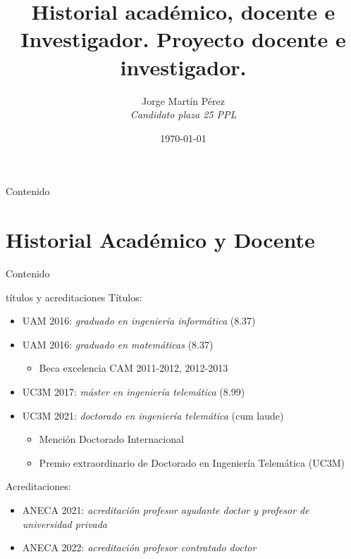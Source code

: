 \documentclass[xcolor=table,xcolor=x11names]{beamer}
\title{Historial académico, docente e Investigador.
Proyecto docente e investigador.}
\date{\today}
\author{Jorge Martín Pérez\\\emph{Candidato plaza 25 PPL}}
\begin{document}
\begin{frame}
\titlepage
\end{frame}

\setcounter{framenumber}{0}


\begin{frame}[allowframebreaks]{Contenido}
    \tableofcontents
\end{frame}



\section{Historial Académico y Docente}
\begin{frame}[allowframebreaks]{Contenido}
    \tableofcontents[currentsection]
\end{frame}


\begin{frame}{\secname}{títulos y acreditaciones}
    Títulos:
    \begin{itemize}
        \item UAM 2016: \emph{graduado en ingeniería informática} (8.37)
        \item UAM 2016: \emph{graduado en matemáticas} (8.37)
            \begin{itemize}
                \item Beca excelencia CAM 2011-2012, 2012-2013
            \end{itemize}
        \item UC3M 2017: \emph{máster en ingeniería telemática} (8.99)
        \item UC3M 2021: \emph{doctorado en ingeniería telemática} (cum laude)
            \begin{itemize}
                \item Mención Doctorado Internacional
                \item Premio extraordinario de Doctorado en
                    Ingeniería Telemática (UC3M)
            \end{itemize}
    \end{itemize}
    Acreditaciones:
    \begin{itemize}
        \item ANECA 2021: \emph{acreditación profesor ayudante doctor y profesor de universidad privada}
        \item ANECA 2022: \emph{acreditación profesor
            contratado doctor}
    \end{itemize}
\end{frame}
\end{document}
